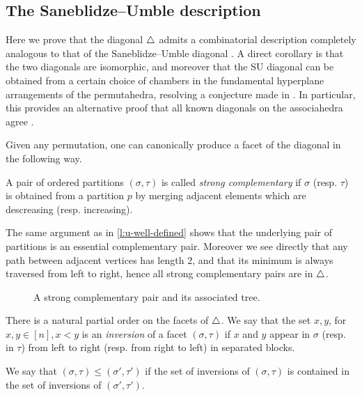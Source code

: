 
\subsection{The Saneblidze--Umble description}

Here we prove that the diagonal $\triangle$ admits a combinatorial description completely analogous to that of the Saneblidze--Umble diagonal \cite{SaneblidzeUmble04}. 
A direct corollary is that the two diagonals are isomorphic, and moreover that the SU diagonal can be obtained from a certain choice of chambers in the fundamental hyperplane arrangements of the permutahedra, resolving a conjecture made in \cite{LA21}.
In particular, this provides an alternative proof that all known diagonals on the associahedra agree \cite{saneblidzeComparingDiagonalsAssociahedra2022}.

Given any permutation, one can canonically produce a facet of the diagonal in the following way. 

\begin{definition}
    A pair of ordered partitions $(\sigma,\tau)$ is called \emph{strong complementary} if $\sigma$ (resp. $\tau$) is obtained from a partition $p$ by merging adjacent elements which are descreasing (resp. increasing).
\end{definition}

The same argument as in \cref{l:u-well-defined} shows that the underlying pair of partitions is an essential complementary pair. 
Moreover we see directly that any path between adjacent vertices has length $2$, and that its minimum is always traversed from left to right, hence all strong complementary pairs are in $\triangle$. 

\begin{figure}[h!]
    \label{f:strong-complementary}
    \caption{A strong complementary pair and its associated tree.}
\end{figure}

There is a natural partial order on the facets of $\triangle$. 
We say that the set ${x,y}$, for $x,y \in [n], x<y$ is an \emph{inversion} of a facet $(\sigma,\tau)$ if $x$ and $y$ appear in $\sigma$ (resp. in $\tau$) from left to right (resp. from right to left) in separated blocks. 

\begin{definition}
    We say that $(\sigma,\tau) \leq (\sigma',\tau')$ if the set of inversions of $(\sigma,\tau)$ is contained in the set of inversions of $(\sigma',\tau')$.
\end{definition}

